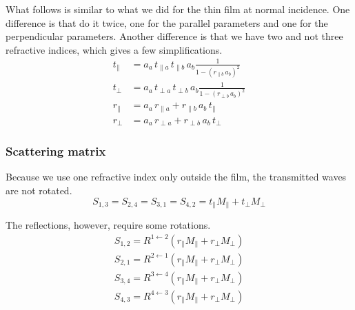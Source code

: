What follows is similar to what we did for the thin film at normal incidence.
One difference is that do it twice, one for the parallel parameters and one for the perpendicular parameters.
Another difference is that we have two and not three refractive indices, which gives a few simplifications.
\begin{subequations}
    \begin{align}
        t_\parallel
        &=
        a_a \,
        t_{\parallel a} \, t_{\parallel b} \, a_b
        \frac{1}{
            1 - (r_{\parallel b} \, a_b)^2
        }
        \\
        t_\perp
        &=
        a_a \,
        t_{\perp a} \, t_{\perp b} \, a_b
        \frac{1}{
            1 - (r_{\perp b} \, a_b)^2
        }
        \\
        r_\parallel
        &=
        a_a \,
        r_{\parallel a} + r_{\parallel b} \, a_b \, t_\parallel
        \\
        r_\perp
        &=
        a_a \,
        r_{\perp a} + r_{\perp b} \, a_b \, t_\perp
    \end{align}
\end{subequations}

\subsubsection{Scattering matrix}
Because we use one refractive index only outside the film, the transmitted waves are not rotated.
\begin{equation}
    S_{1, 3} =
    S_{2, 4} =
    S_{3, 1} =
    S_{4, 2} =
    t_\parallel M_\parallel
    +
    t_\perp M_\perp
    \label{eq:thin_film_s_t}
\end{equation}

The reflections, however, require some rotations.
\begin{subequations}
    \begin{align}
        S_{1, 2} = R^{1 \leftarrow 2} (r_\parallel M_\parallel + r_\perp M_\perp) \\
        S_{2, 1} = R^{2 \leftarrow 1} (r_\parallel M_\parallel + r_\perp M_\perp) \\
        S_{3, 4} = R^{3 \leftarrow 4} (r_\parallel M_\parallel + r_\perp M_\perp) \\
        S_{4, 3} = R^{4 \leftarrow 3} (r_\parallel M_\parallel + r_\perp M_\perp)
    \end{align}
    \label{eq:thin_film_s_r}
\end{subequations}

